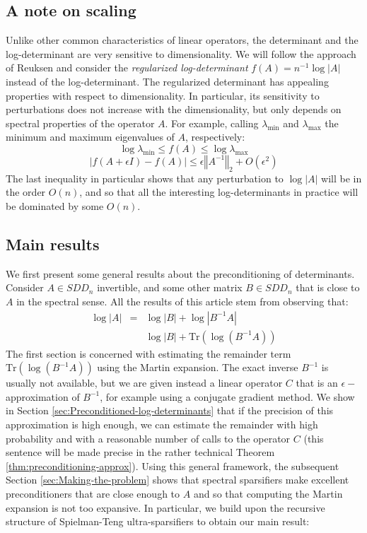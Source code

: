 \subsection{A note on scaling}

Unlike other common characteristics of linear operators, the determinant
and the log-determinant are very sensitive to dimensionality. We will
follow the approach of Reuksen \cite{Reusken2002} and consider the
\emph{regularized log-determinant} $f\left(A\right)=n^{-1}\log\left|A\right|$
instead of the log-determinant. The regularized determinant has appealing
properties with respect to dimensionality. In particular, its sensitivity
to perturbations does not increase with the dimensionality, but only
depends on spectral properties of the operator $A$. For example,
calling $\lambda_{\min}$ and $\lambda_{\max}$ the minimum and maximum
eigenvalues of $A$, respectively: 
\[
\log\lambda_{\min}\leq f\left(A\right)\leq\log\lambda_{\max}
\]
\[
\left|f\left(A+\epsilon I\right)-f\left(A\right)\right|\leq\epsilon\left\Vert A^{-1}\right\Vert _{2}+O\left(\epsilon^{2}\right)
\]
The last inequality in particular shows that any perturbation to $\log\left|A\right|$
will be in the order $O\left(n\right)$, and so that all the interesting
log-determinants in practice will be dominated by some $O\left(n\right)$.


\subsection{Main results}

We first present some general results about the preconditioning of
determinants. Consider $A\in SDD_{n}$ invertible, and some other
matrix $B\in SDD_{n}$ that is close to $A$ in the spectral sense.
All the results of this article stem from observing that: 
\begin{eqnarray*}
\log\left|A\right| & = & \log\left|B\right|+\log\left|B^{-1}A\right|\\
 &  & \log\left|B\right|+\text{Tr}\left(\log\left(B^{-1}A\right)\right)
\end{eqnarray*}
The first section is concerned with estimating the remainder term
$\text{Tr}\left(\log\left(B^{-1}A\right)\right)$ using the Martin
expansion. The exact inverse $B^{-1}$ is usually not available, but
we are given instead a linear operator $C$ that is an $\epsilon-$approximation
of $B^{-1}$, for example using a conjugate gradient method. We show
in Section \ref{sec:Preconditioned-log-determinants} that if the
precision of this approximation is high enough, we can estimate the
remainder with high probability and with a reasonable number of calls
to the operator $C$ (this sentence will be made precise in the rather
technical Theorem \ref{thm:preconditioning-approx}). Using this general
framework, the subsequent Section \ref{sec:Making-the-problem} shows
that spectral sparsifiers make excellent preconditioners that are
close enough to $A$ and so that computing the Martin expansion is
not too expansive. In particular, we build upon the recursive structure
of Spielman-Teng ultra-sparsifiers to obtain our main result:

